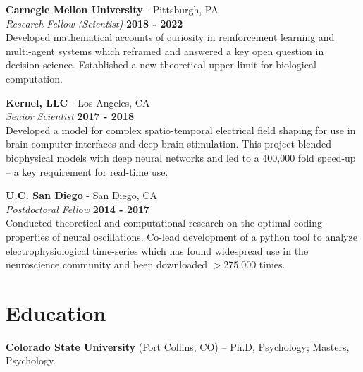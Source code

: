\documentclass[margin,line]{res}
\begin{document}
\begin{resume}
\vspace{-.1cm}
{\bf Carnegie Mellon University} - Pittsburgh, PA \\
{\em Research Fellow (Scientist)} \hfill {\bf 2018 - 2022}\\
Developed mathematical accounts of curiosity in reinforcement learning and multi-agent systems which reframed and answered a key open question in decision science. Established a new theoretical upper limit for biological computation. 

\vspace{-.1cm}
{\bf Kernel, LLC} - Los Angeles, CA\\
{\em Senior Scientist} \hfill {\bf 2017 - 2018}\\
Developed a model for complex spatio-temporal electrical field shaping for use in brain computer interfaces and deep brain stimulation. This project blended biophysical models with deep neural networks and led to a 400,000 fold speed-up -- a key requirement for real-time use.

\vspace{-.1cm}
{\bf U.C. San Diego} - San Diego, CA\\
{\em Postdoctoral Fellow} \hfill {\bf 2014 - 2017}\\
Conducted theoretical and computational research on the optimal coding properties of neural oscillations. Co-lead development of a python tool to analyze electrophysiological time-series which has found widespread use in the neuroscience community and been downloaded $>$275,000 times.



\vspace{-.2cm}
\section{\sc Education}
{\bf Colorado State University} (Fort Collins, CO) --  Ph.D, Psychology; Masters, Psychology.\\
\vspace*{-.15in}


\end{resume}
\end{document}
